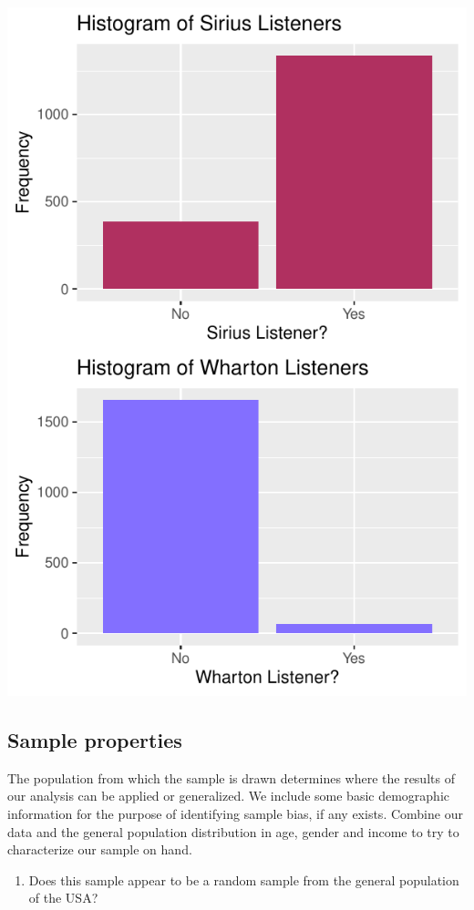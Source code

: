 \documentclass[
]{article}
\providecommand{\tightlist}{%
  \setlength{\itemsep}{0pt}\setlength{\parskip}{0pt}}
\begin{document}
\includegraphics{hw1_sp2022_files/figure-latex/unnamed-chunk-13-1.pdf}

\hypertarget{sample-properties}{%
\subsection{Sample properties}\label{sample-properties}}

The population from which the sample is drawn determines where the
results of our analysis can be applied or generalized. We include some
basic demographic information for the purpose of identifying sample
bias, if any exists. Combine our data and the general population
distribution in age, gender and income to try to characterize our sample
on hand.

\begin{enumerate}
\def\labelenumi{\roman{enumi}.}
\tightlist
\item
  Does this sample appear to be a random sample from the general
  population of the USA?
\end{enumerate}
\end{document}
